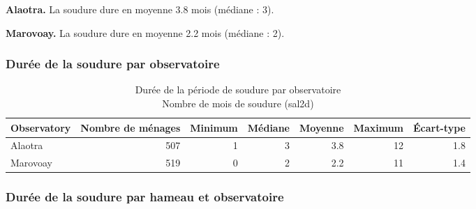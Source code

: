 \documentclass[
  french,
  letterpaper,
]{report}
\begin{document}
\textbf{Alaotra.} La soudure dure en moyenne 3.8 mois (médiane : 3).

\textbf{Marovoay.} La soudure dure en moyenne 2.2 mois (médiane : 2).

\subsubsection{Durée de la soudure par
observatoire}\label{duruxe9e-de-la-soudure-par-observatoire}

\begin{table}
\caption*{
{\fontsize{20}{25}\selectfont  Durée de la période de soudure par observatoire\fontsize{12}{15}\selectfont } \\ 
{\fontsize{14}{17}\selectfont  Nombre de mois de soudure (sal2d)\fontsize{12}{15}\selectfont }
} 
\fontsize{12.0pt}{14.0pt}\selectfont
\begin{tabular*}{\linewidth}{@{\extracolsep{\fill}}lrrrrrr}
\toprule
{\bfseries Observatory} & Nombre de ménages & {\bfseries Minimum} & Médiane & {\bfseries Moyenne} & {\bfseries Maximum} & Écart-type \\ 
\midrule\addlinespace[2.5pt]
Alaotra & 507 & 1 & 3 & 3.8 & 12 & 1.8 \\ 
Marovoay & 519 & 0 & 2 & 2.2 & 11 & 1.4 \\ 
\bottomrule
\end{tabular*}
\end{table}

\subsubsection{Durée de la soudure par hameau et
observatoire}\label{duruxe9e-de-la-soudure-par-hameau-et-observatoire}
\end{document}

